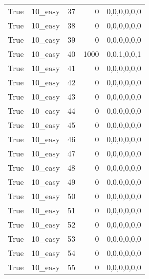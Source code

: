 \begin{tabular}{llrrl}
 True            & 10\_easy             &            37 &                     0 & 0,0,0,0,0,0   \\
 True            & 10\_easy             &            38 &                     0 & 0,0,0,0,0,0   \\
 True            & 10\_easy             &            39 &                     0 & 0,0,0,0,0,0   \\
 True            & 10\_easy             &            40 &                  1000 & 0,0,1,0,0,1   \\
 True            & 10\_easy             &            41 &                     0 & 0,0,0,0,0,0   \\
 True            & 10\_easy             &            42 &                     0 & 0,0,0,0,0,0   \\
 True            & 10\_easy             &            43 &                     0 & 0,0,0,0,0,0   \\
 True            & 10\_easy             &            44 &                     0 & 0,0,0,0,0,0   \\
 True            & 10\_easy             &            45 &                     0 & 0,0,0,0,0,0   \\
 True            & 10\_easy             &            46 &                     0 & 0,0,0,0,0,0   \\
 True            & 10\_easy             &            47 &                     0 & 0,0,0,0,0,0   \\
 True            & 10\_easy             &            48 &                     0 & 0,0,0,0,0,0   \\
 True            & 10\_easy             &            49 &                     0 & 0,0,0,0,0,0   \\
 True            & 10\_easy             &            50 &                     0 & 0,0,0,0,0,0   \\
 True            & 10\_easy             &            51 &                     0 & 0,0,0,0,0,0   \\
 True            & 10\_easy             &            52 &                     0 & 0,0,0,0,0,0   \\
 True            & 10\_easy             &            53 &                     0 & 0,0,0,0,0,0   \\
 True            & 10\_easy             &            54 &                     0 & 0,0,0,0,0,0   \\
 True            & 10\_easy             &            55 &                     0 & 0,0,0,0,0,0   \\

\end{tabular}
